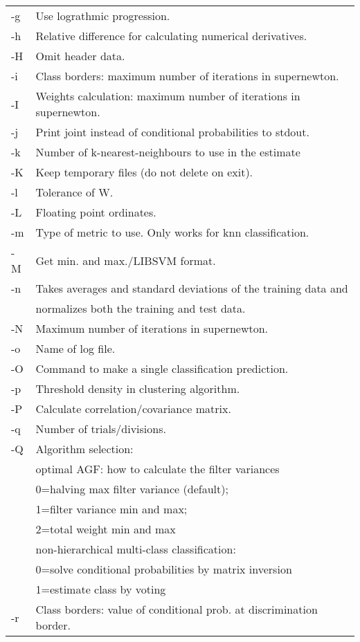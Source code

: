 \documentclass[12pt]{article}
\begin{document}
\begin{table}
\begin{tabular}{ll}
-g&		Use lograthmic progression.\\
-h&		Relative difference for calculating numerical derivatives.\\
-H&		Omit header data.\\
-i&		Class borders: maximum number of iterations in supernewton.\\
-I&		Weights calculation: maximum number of iterations in supernewton.\\
-j&		Print joint instead of conditional probabilities to stdout.\\
-k&		Number of k-nearest-neighbours to use in the estimate\\
-K&		Keep temporary files (do not delete on exit).\\
-l&		Tolerance of W.\\
-L	&	Floating point ordinates.\\
-m	&	Type of metric to use.  Only works for knn classification.\\
-M	&	Get min. and max./LIBSVM format.\\
-n	&	Takes averages and standard deviations of the training data and \\
	  &	  normalizes both the training and test data.\\
-N	&	Maximum number of iterations in supernewton.\\
-o	&	Name of log file.\\
-O	&	Command to make a single classification prediction.\\
-p	&	Threshold density in clustering algorithm.\\
-P	&	Calculate correlation/covariance matrix.\\
-q	&	Number of trials/divisions.\\
-Q	&	Algorithm selection:\\
	  &	  optimal AGF: how to calculate the filter variances\\
	  &		0=halving max filter variance (default);\\
	  &		1=filter variance min and max;\\
	  &		2=total weight min and max\\
	  &	  non-hierarchical multi-class classification:\\
	  &		0=solve conditional probabilities by matrix inversion\\
	  &		1=estimate class by voting\\
-r	&	Class borders: value of conditional prob. at discrimination border.\\

\end{tabular}
\end{table}
\end{document}
